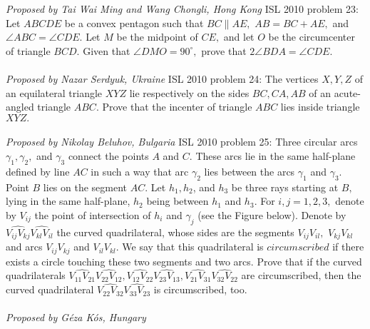 \textit{Proposed by Tai Wai Ming and Wang Chongli, Hong Kong} 
ISL 2010 problem 23:  Let $ABCDE$ be a convex pentagon such that $BC \parallel AE,$ $AB = BC +  AE,$ and $\angle ABC = \angle CDE.$ Let $M$ be the midpoint of $CE,$ and let $O$ be the circumcenter of triangle $BCD.$ Given that $\angle DMO = 90^{\circ},$ prove that $2 \angle BDA = \angle CDE.$ \\\\
\textit{Proposed by Nazar Serdyuk, Ukraine} 
ISL 2010 problem 24:  The vertices $X, Y , Z$ of an equilateral triangle $XYZ$ lie respectively on the sides $BC, CA, AB$ of an acute-angled triangle $ABC.$ Prove that the incenter of triangle $ABC$ lies inside triangle $XYZ.$ \\\\
\textit{Proposed by Nikolay Beluhov, Bulgaria} 
ISL 2010 problem 25:  Three circular arcs $\gamma_1, \gamma_2,$ and $\gamma_3$ connect the points $A$ and $C.$ These arcs lie in the same half-plane defined by line $AC$ in such a way that arc $\gamma_2$ lies between the arcs $\gamma_1$ and $\gamma_3.$ Point $B$ lies on the segment $AC.$ Let $h_1, h_2$, and $h_3$ be three rays starting at $B,$ lying in the same half-plane, $h_2$ being between $h_1$ and $h_3.$ For $i, j = 1, 2, 3,$ denote by $V_{ij}$ the point of intersection of $h_i$ and $\gamma_j$ (see the Figure below). Denote by $\widehat{V_{ij}V_{kj}}\widehat{V_{kl}V_{il}}$ the curved quadrilateral, whose sides are the segments $V_{ij}V_{il},$ $V_{kj}V_{kl}$ and arcs $V_{ij}V_{kj}$ and $V_{il}V_{kl}.$ We say that this quadrilateral is $circumscribed$ if there exists a circle touching these two segments and two arcs. Prove that if the curved quadrilaterals $\widehat{V_{11}V_{21}}\widehat{V_{22}V_{12}}, \widehat{V_{12}V_{22}}\widehat{V_{23}V_{13}},\widehat{V_{21}V_{31}}\widehat{V_{32}V_{22}}$ are circumscribed, then the curved quadrilateral $\widehat{V_{22}V_{32}}\widehat{V_{33}V_{23}}$ is circumscribed, too. \\\\
\textit{Proposed by Géza Kós, Hungary}
